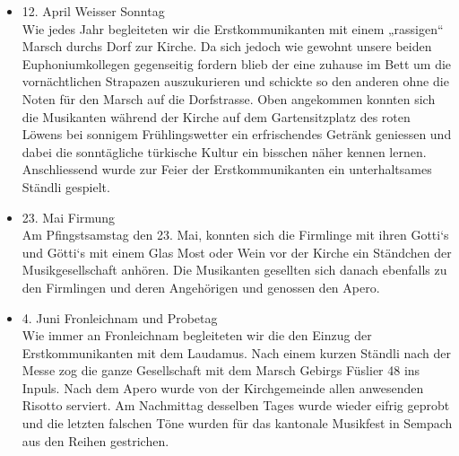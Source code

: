\begin{history}
\begin{itemize}
            \item 12. April Weisser Sonntag\\
                  Wie jedes Jahr begleiteten wir die Erstkommunikanten mit einem
                  „rassigen“ Marsch durchs Dorf zur Kirche. Da sich jedoch wie
                  gewohnt unsere beiden Euphoniumkollegen gegenseitig fordern
                  blieb der eine zuhause im Bett um die vornächtlichen Strapazen
                  auszukurieren und schickte so den anderen ohne die Noten für
                  den Marsch auf die Dorfstrasse. Oben angekommen konnten sich
                  die Musikanten während der Kirche auf dem Gartensitzplatz des
                  roten Löwens bei sonnigem Frühlingswetter ein erfrischendes
                  Getränk geniessen und dabei die sonntägliche türkische Kultur
                  ein bisschen näher kennen lernen. Anschliessend wurde zur
                  Feier der Erstkommunikanten ein unterhaltsames Ständli
                  gespielt.

            \item  23. Mai Firmung\\
                  Am Pfingstsamstag den 23. Mai, konnten sich die Firmlinge mit
                  ihren Gotti`s und Götti`s mit einem Glas Most oder Wein vor
                  der Kirche ein Ständchen der Musikgesellschaft anhören. Die
                  Musikanten gesellten sich danach ebenfalls zu den Firmlingen
                  und deren Angehörigen und genossen den Apero.

            \item 4. Juni Fronleichnam und Probetag\\
                  Wie immer an Fronleichnam begleiteten wir die den Einzug der
                  Erstkommunikanten mit dem Laudamus. Nach einem kurzen Ständli
                  nach der Messe zog die ganze Gesellschaft mit dem Marsch
                  Gebirgs Füslier 48 ins Inpuls. Nach dem Apero wurde von der
                  Kirchgemeinde allen anwesenden Risotto serviert. Am Nachmittag
                  desselben Tages wurde wieder eifrig geprobt und die letzten
                  falschen Töne wurden für das kantonale Musikfest in Sempach
                  aus den Reihen gestrichen.


\end{itemize}
\end{history}

